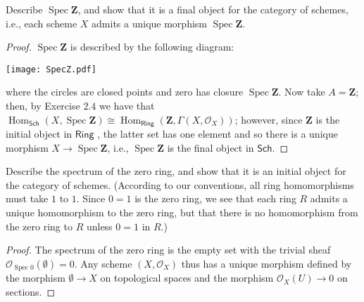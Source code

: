\documentclass[10pt]{article}
\theoremstyle{definition}
\theoremstyle{remark}
\numberwithin{equation}{section}
\numberwithin{figure}{subsubsection}
\DeclareMathOperator{\Spec}{Spec}
\DeclareMathOperator{\Hom}{Hom}
\newcommand{\OO}{\mathcal{O}}
\newcommand{\Sch}{\mathsf{Sch}}
\newcommand{\Ring}{\mathsf{Ring}}
\begin{document}
\begin{problem}
  Describe $\Spec\mathbf{Z}$, and show that it is a final object for the category of schemes, i.e., each scheme $X$ admits a unique morphism $\Spec\mathbf{Z}$.
\end{problem}
\begin{proof}
  $\Spec\mathbf{Z}$ is described by the following diagram:
  \vspace{1em}
  \begin{center}
    \texttt{[image: SpecZ.pdf]}
  \end{center}
  where the circles are closed points and zero has closure $\Spec\mathbf{Z}$.
  Now take $A = \mathbf{Z}$; then, by Exercise $2.4$ we have that $\Hom_\Sch(X,\Spec\mathbf{Z}) \cong \Hom_\Ring(\mathbf{Z},\Gamma(X,\OO_X))$; however, since $\mathbf{Z}$ is the initial object in $\Ring$ \cite[Prop.~11.3.10]{Art11}, the latter set has one element and so there is a unique morphism $X\to\Spec\mathbf{Z}$, i.e., $\Spec\mathbf{Z}$ is the final object in $\Sch$.
\end{proof}

\begin{problem}
  Describe the spectrum of the zero ring, and show that it is an initial object for the category of schemes. (According to our conventions, all ring homomorphisms must take $1$ to $1$. Since $0=1$ is the zero ring, we see that each ring $R$ admits a unique homomorphism to the zero ring, but that there is no homomorphism from the zero ring to $R$ unless $0 = 1$ in $R$.)
\end{problem}
\begin{proof}
  The spectrum of the zero ring is the empty set with the trivial sheaf $\OO_{\Spec 0}(\emptyset) = 0$. Any scheme $(X,\OO_X)$ thus has a unique morphism defined by the morphism $\emptyset \to X$ on topological spaces and the morphism $\OO_X(U) \to 0$ on sections.
\end{proof}
\end{document}
